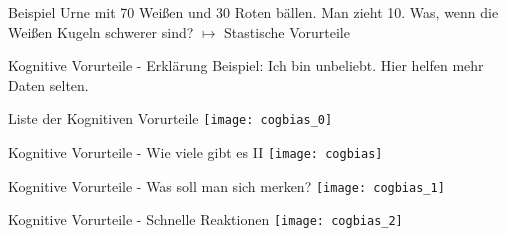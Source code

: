 \begin{frame}[c]{Beispiel}
    \pause
    Urne mit 70 Weißen und 30 Roten bällen. \newline
    \newline \pause
    Man zieht 10. \newline
    \newline \pause
    Was, wenn die Weißen Kugeln schwerer sind? \newline
    \newline \pause
    $\mapsto$ Stastische Vorurteile
\end{frame}


\begin{frame}[c]{Kognitive Vorurteile - Erklärung}
    \pause
    Beispiel: Ich bin unbeliebt. \newline
    \newline \pause
    Hier helfen mehr Daten selten.
\end{frame}




\begin{frame}[c]{Liste der Kognitiven Vorurteile}
    \centering
    \texttt{[image: cogbias\_0]}
\end{frame}

\begin{frame}[c]{Kognitive Vorurteile - Wie viele gibt es II}
    \centering
    \texttt{[image: cogbias]}
\end{frame}

\begin{frame}[c]{Kognitive Vorurteile - Was soll man sich merken?}
    \centering
    \texttt{[image: cogbias\_1]}
\end{frame}

\begin{frame}[c]{Kognitive Vorurteile - Schnelle Reaktionen}
    \centering
    \texttt{[image: cogbias\_2]}
\end{frame}

